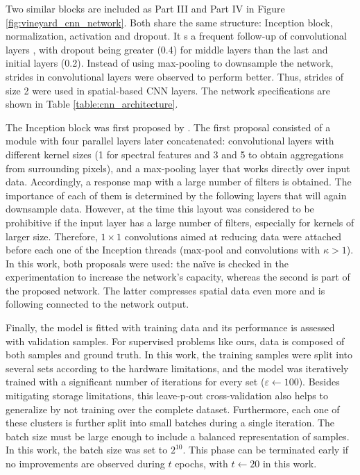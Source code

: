 Two similar blocks are included as Part III and Part IV in Figure \ref{fig:vineyard_cnn_network}. Both share the same structure: Inception block, normalization, activation and dropout. It s a frequent follow-up of convolutional layers \cite{li_faster_2022, xue_attention-based_2021}, with dropout being greater (0.4) for middle layers than the last and initial layers (0.2). Instead of using max-pooling to downsample the network, strides in convolutional layers were observed to perform better. Thus, strides of size 2 were used in spatial-based CNN layers. The network specifications are shown in Table \ref{table:cnn_architecture}.

The Inception block was first proposed by \cite{szegedy_going_2014}. The first proposal consisted of a module with four parallel layers later concatenated: convolutional layers with different kernel sizes (1 for spectral features and 3 and 5 to obtain aggregations from surrounding pixels), and a max-pooling layer that works directly over input data. Accordingly, a response map with a large number of filters is obtained. The importance of each of them is determined by the following layers that will again downsample data. However, at the time this layout was considered to be prohibitive if the input layer has a large number of filters, especially for kernels of larger size. Therefore, $1\times1$ convolutions aimed at reducing data were attached before each one of the Inception threads (max-pool and convolutions with $\kappa > 1$). In this work, both proposals were used: the naïve is checked in the experimentation to increase the network's capacity, whereas the second is part of the proposed network. The latter compresses spatial data even more and is following connected to the network output. 

Finally, the model is fitted with training data and its performance is assessed with validation samples. For supervised problems like ours, data is composed of both samples and ground truth. In this work, the training samples were split into several sets according to the hardware limitations, and the model was iteratively trained with a significant number of iterations for every set ($\varepsilon \gets 100$). Besides mitigating storage limitations, this leave-p-out cross-validation also helps to generalize by not training over the complete dataset. Furthermore, each one of these clusters is further split into small batches during a single iteration. The batch size must be large enough to include a balanced representation of samples. In this work, the batch size was set to $2^{10}$. This phase can be terminated early if no improvements are observed during $t$ epochs, with $t \gets 20$ in this work.

